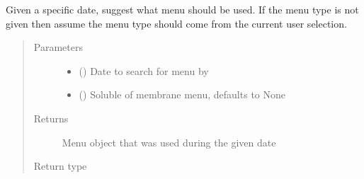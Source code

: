 \documentclass[letterpaper,10pt,english]{sphinxmanual}
\begin{document}
\begin{fulllineitems}
\begin{fulllineitems}
\end{fulllineitems}


\begin{fulllineitems}
\label{\detokenize{polo.windows:polo.windows.run_importer_dialog.RunImporterDialog.suggest_menu_by_date}}
Given a specific date, suggest what menu should be used. If the
menu type is not given then assume the menu type should come from
the current user selection.
\begin{quote}\begin{description}
\item[{Parameters}] \leavevmode\begin{itemize}
\item {} 
 () \textendash{} Date to search for menu by

\item {} 
 (\sphinxstyleliteralemphasis{\sphinxupquote{, }}) \textendash{} Soluble of membrane menu, defaults to None

\end{itemize}

\item[{Returns}] \leavevmode
Menu object that was used during the given date

\item[{Return type}] \leavevmode
{\hyperref[\detokenize{polo.utils:polo.utils.io_utils.Menu}]{}}

\end{description}\end{quote}

\end{fulllineitems}



\end{fulllineitems}
\end{document}
